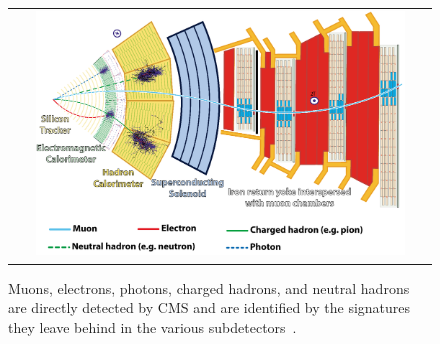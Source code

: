 \begin{figure}[!h]
  \begin{center}
    \begin{tabular}{c}
        \includegraphics[width=0.9\textwidth]{fig_LHC_CMS/CMS_Layers.png}
    \end{tabular}
    \caption{Muons, electrons, photons, charged hadrons, and neutral hadrons are directly detected by CMS and are identified by the signatures they leave behind in the various subdetectors~\cite{Sirunyan:2270046}.
            }
    \label{CMS_Layers}
  \end{center}
\end{figure}


